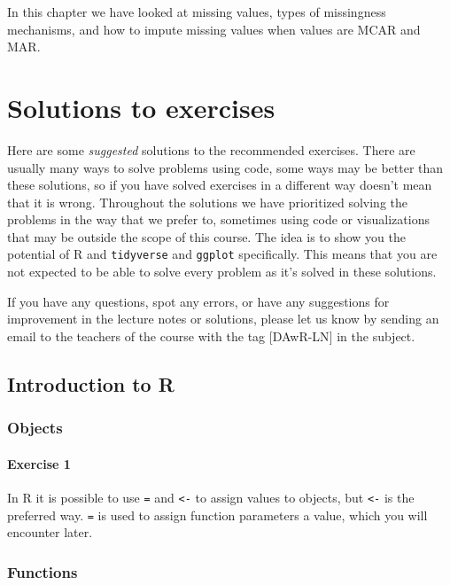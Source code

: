 \documentclass[
  letterpaper,
  DIV=11,
  numbers=noendperiod]{scrreprt}
\begin{document}
In this chapter we have looked at missing values, types of missingness
mechanisms, and how to impute missing values when values are MCAR and
MAR.

\part{Solutions to exercises}

Here are some \emph{suggested} solutions to the recommended exercises.
There are usually many ways to solve problems using code, some ways may
be better than these solutions, so if you have solved exercises in a
different way doesn't mean that it is wrong. Throughout the solutions we
have prioritized solving the problems in the way that we prefer to,
sometimes using code or visualizations that may be outside the scope of
this course. The idea is to show you the potential of R and
\texttt{tidyverse} and \texttt{ggplot} specifically. This means that you
are not expected to be able to solve every problem as it's solved in
these solutions.

If you have any questions, spot any errors, or have any suggestions for
improvement in the lecture notes or solutions, please let us know by
sending an email to the teachers of the course with the tag
{[}DAwR-LN{]} in the subject.

\chapter{Introduction to R}\label{introduction-to-r-1}

\section{Objects}\label{objects-1}

\subsection{Exercise 1}\label{exercise-1}

In R it is possible to use \texttt{=} and \texttt{\textless{}-} to
assign values to objects, but \texttt{\textless{}-} is the preferred
way. \texttt{=} is used to assign function parameters a value, which you
will encounter later.

\section{Functions}\label{functions-1}
\end{document}
